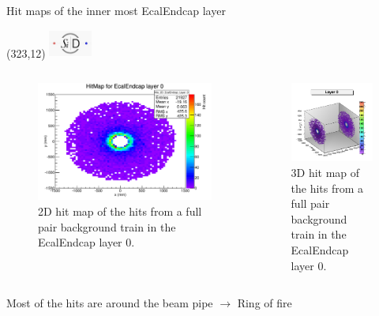 \documentclass[xcolor={dvipsnames}]{beamer}
\newcommand{\sidlogo}{
  \setlength{\TPHorizModule}{1pt}
  \setlength{\TPVertModule}{1pt}
  \begin{textblock}{1}(323,12)
   \includegraphics[width=40pt,height=26pt]{figures/SiD.jpeg}
  \end{textblock}
  }
\begin{document}
\begin{frame}{Hit maps of the inner most EcalEndcap layer}
\sidlogo
\begin{columns}[T]
\begin{column}[b]{0.5\textwidth}
 \begin{figure}
\centering
\includegraphics[height=0.5\textheight]{figures/sidloi3_pairs_1312_EcalEndcap_Hits_EcalEndcap_Hits_2D_EcalEndcap_Layer_0-eps-converted-to.pdf}
\caption{\small 2D hit map of the hits from a full pair background train in the EcalEndcap layer 0.}
\end{figure}
\end{column}
\begin{column}[b]{0.5\textwidth}
 \begin{figure}
\centering
\includegraphics[height=0.5\textheight]{figures/Hits_3D_EcalEndcap_Layer_0.png}
\caption{\small 3D hit map of the hits from a full pair background train in the EcalEndcap layer 0.}
\end{figure}
\end{column}
\end{columns}
Most of the hits are around the beam pipe $\rightarrow$ Ring of fire
\end{frame}
\end{document}
